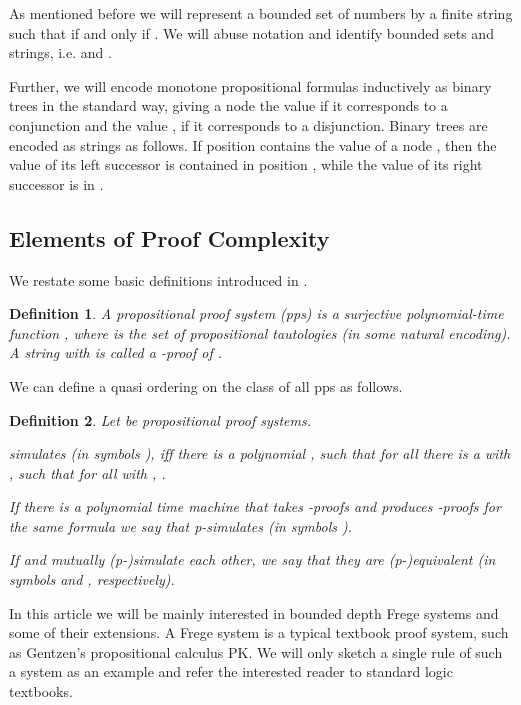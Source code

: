 \documentclass{LMCS}
\newtheorem{definition}{Definition}[section]
\begin{document}
As mentioned before we will represent a bounded set of numbers  by a finite string  such that  if and only if . We will abuse notation and identify bounded sets
and strings, i.e.  and .

Further, we will encode monotone propositional formulas inductively as binary trees in the standard way, giving
a node the value  if it corresponds to a conjunction and the value , if it corresponds to a disjunction.
Binary trees are encoded as strings as follows. If position  contains the value of a node ,
then the value of its left successor is contained in position , while the value of its right successor is in
.

\subsection{Elements of Proof Complexity}\label{Sec:Elements Proof Cmpl}

We restate some basic definitions introduced in \cite{CR79}.

\begin{definition}\label{def pps}
  A {\em propositional proof system (pps)} is a surjective polynomial-time function
  , where  is the set of propositional tautologies (in
  some natural encoding). A string  with  is called a {\em -proof} of .
\end{definition}

We can define a quasi ordering on the class of all pps as follows.

\begin{definition}\label{def:simulation}
  Let  be propositional proof systems.
  \begin{iteMize}{}
    \item  simulates  (in symbols ), iff there is a polynomial , such that for all  there is a
     with , such that for all  with , .
    \item If there is a polynomial time machine that takes -proofs and produces -proofs for the same
    formula we say that
     p-simulates  (in symbols ).
    \item If  and  mutually (p-)simulate each other, we say that they are (p-)equivalent (in symbols
     and , respectively).
  \end{iteMize}\smallskip
\end{definition}

\noindent In this article we will be mainly interested in bounded depth Frege systems and some of their extensions. A
Frege system is a typical textbook proof system, such as Gentzen's propositional calculus PK. We will only
sketch a single rule of such a system as an example and refer the interested reader to standard logic textbooks.
\end{document}
